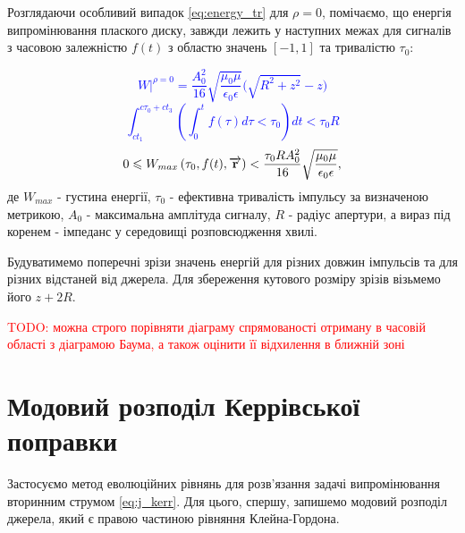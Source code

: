 Розглядаючи особливий випадок \ref{eq:energy_tr} для $ \rho = 0 $, помічаємо,
що енергія випромінювання плаского диску, завжди лежить у наступних межах для 
сигналів з часовою залежністю $ f(t) $ з областю значень 
$ \left[ -1, 1 \right] $ та тривалістю $ \tau_0 $:

\textcolor{blue}{ \begin{equation*}
\left. W \right|^{\rho=0} = 
\frac{A_0^2}{16} \sqrt{\frac{\mu_0 \mu}{\epsilon_0 \epsilon}}
\Big( \sqrt{R^2+z^2} - z \Big)
\end{equation*} }
%
\textcolor{blue}{ \begin{equation*}
\int_{ct_1}^{c\tau_0+ct_3} 
\left( \int_0^t f(\tau) d \tau < \tau_0 \right) dt < \tau_0 R
\end{equation*} }
%
\begin{equation}
0 \leqslant W_{max} \left( \tau_0, f(t), \overrightarrow{\mathbf r} \right) < 
\frac{\tau_0 R A_0^2}{16} \sqrt{\frac{\mu_0 \mu}{\epsilon_0 \epsilon}},
\end{equation}
%
де $ W_{max} $ - густина енергії, $ \tau_0 $ - ефективна тривалість імпульсу 
за визначеною метрикою, $ A_0 $ - максимальна амплітуда сигналу, $ R $ - 
радіус апертури, а вираз під коренем - імпеданс у середовищі розповсюдження 
хвилі.

Будуватимемо поперечні зрізи значень енергій
для різних довжин імпульсів та для різних відстаней від джерела.
Для збереження кутового розміру зрізів візьмемо його $ z + 2R $.

\textcolor{red}{ TODO: можна строго порівняти діаграму спрямованості 
отриману в часовій області з діаграмою Баума, а також оцінити її відхилення 
в ближній зоні }

\section{Модовий розподіл Керрівської поправки}

Застосуємо метод еволюційних рівнянь для розв'язання задачі випромінювання 
вторинним струмом \eqref{eq:j_kerr}. Для цього, спершу, запишемо модовий
розподіл джерела, який є правою частиною рівняння Клейна-Гордона. 

